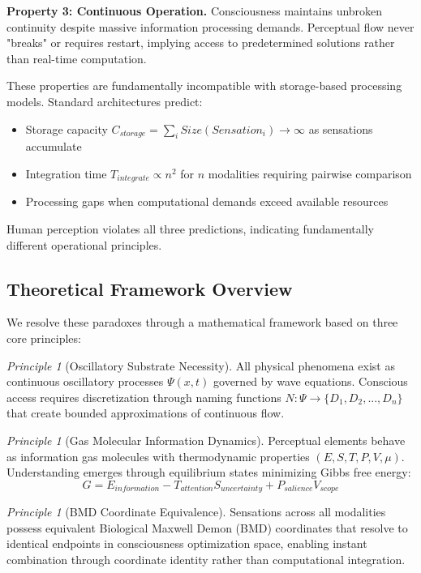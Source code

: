 \documentclass[12pt]{article}
\theoremstyle{definition}
\theoremstyle{remark}
\newtheorem{principle}[theorem]{Principle}
\begin{document}
\textbf{Property 3: Continuous Operation.} Consciousness maintains unbroken continuity despite massive information processing demands. Perceptual flow never "breaks" or requires restart, implying access to predetermined solutions rather than real-time computation.

These properties are fundamentally incompatible with storage-based processing models. Standard architectures predict:
\begin{itemize}
\item Storage capacity $C_{storage} = \sum_{i} Size(Sensation_i) \rightarrow \infty$ as sensations accumulate
\item Integration time $T_{integrate} \propto n^2$ for $n$ modalities requiring pairwise comparison
\item Processing gaps when computational demands exceed available resources
\end{itemize}

Human perception violates all three predictions, indicating fundamentally different operational principles.

\subsection{Theoretical Framework Overview}

We resolve these paradoxes through a mathematical framework based on three core principles:

\begin{principle}[Oscillatory Substrate Necessity]
\label{prin:oscillatory_substrate}
All physical phenomena exist as continuous oscillatory processes $\Psi(x,t)$ governed by wave equations. Conscious access requires discretization through naming functions $N: \Psi \rightarrow \{D_1, D_2, ..., D_n\}$ that create bounded approximations of continuous flow.
\end{principle}

\begin{principle}[Gas Molecular Information Dynamics]
\label{prin:gas_molecular}
Perceptual elements behave as information gas molecules with thermodynamic properties $(E, S, T, P, V, \mu)$. Understanding emerges through equilibrium states minimizing Gibbs free energy:
\begin{equation}
G = E_{information} - T_{attention} S_{uncertainty} + P_{salience} V_{scope}
\end{equation}
\end{principle}

\begin{principle}[BMD Coordinate Equivalence]
\label{prin:bmd_equivalence}
Sensations across all modalities possess equivalent Biological Maxwell Demon (BMD) coordinates that resolve to identical endpoints in consciousness optimization space, enabling instant combination through coordinate identity rather than computational integration.
\end{principle}
\end{document}
